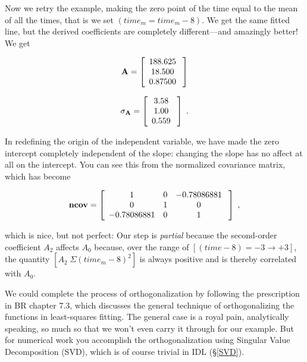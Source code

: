 \documentclass[psfig,preprint]{aastex}
\begin{document}
	Now we retry the example, making the zero point of the time
equal to the mean of all the times, that is we set $(time_m = time_m -
8)$. We get the same fitted line, but the derived coefficients are
completely different---and amazingly better! We get

\begin{mathletters}
\begin{eqnarray}
{\bf A} = \left[
\begin{array}{c}
188.625 \\
18.500 \\
0.87500 \\
\end{array} \; \right] 
\end{eqnarray}

\begin{eqnarray}
{\bf \sigma_A} = \left[
\begin{array}{c}
3.58 \\
1.00 \\
0.559 \\
\end{array} \; \right] \; .
\end{eqnarray}
\end{mathletters}

\noindent In redefining the origin of the independent variable, we have
made the zero intercept completely independent of the slope: changing
the slope has no affect at all on the intercept. You can see this from
the normalized covariance matrix, which has become

\begin{eqnarray}
{\bf ncov} = \left[
\begin{array}{ccc}
1  &     0       &   -0.78086881  \\
   0  &  1   &    0  \\
 -0.78086881 &  0  &  1  \\
\end{array} \; \right] \; ,
\end{eqnarray}

\noindent which is nice, but not perfect: Our step is {\it partial}
because the second-order coefficient $A_2$ affects $A_0$ because, over
the range of $[(time - 8) = -3 \rightarrow +3]$, the quantity $[A_2 \;
\Sigma(time_m -8)^2]$ is always positive and is thereby correlated with
$A_0$.

	We could complete the process of orthogonalization by following
the prescription in BR chapter 7.3, which discusses the general
technique of orthogonalizing the functions in least-squares fitting. The
general case is a royal pain, analytically speaking, so much so that we
won't even carry it through for our example. But for numerical work you
accomplish the orthogonalization using Singular Value Decomposition
(SVD), which is of course trivial in IDL (\S \ref{SVD}).
\end{document}
